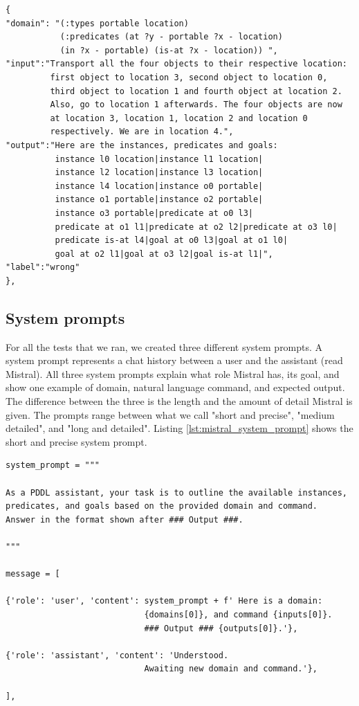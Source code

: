 \begin{lstlisting}[caption={An element of shot set 2. Notice the "label" marker. The output is wrong due to the text before first instance.}, label=lst:elem_shot_set_2]
{
"domain": "(:types portable location)
           (:predicates (at ?y - portable ?x - location)
           (in ?x - portable) (is-at ?x - location)) ",
"input":"Transport all the four objects to their respective location:
         first object to location 3, second object to location 0,
         third object to location 1 and fourth object at location 2.
         Also, go to location 1 afterwards. The four objects are now
         at location 3, location 1, location 2 and location 0
         respectively. We are in location 4.",
"output":"Here are the instances, predicates and goals:
          instance l0 location|instance l1 location|
          instance l2 location|instance l3 location|
          instance l4 location|instance o0 portable|
          instance o1 portable|instance o2 portable|
          instance o3 portable|predicate at o0 l3|
          predicate at o1 l1|predicate at o2 l2|predicate at o3 l0|
          predicate is-at l4|goal at o0 l3|goal at o1 l0|
          goal at o2 l1|goal at o3 l2|goal is-at l1|",
"label":"wrong"
},
\end{lstlisting}

\subsection{System prompts}\label{ssec:system_prompt}
For all the tests that we ran, we created three different system prompts. A system prompt represents a chat history between a user and the assistant (read Mistral). All three system prompts explain what role Mistral has, its goal, and show one example of domain, natural language command, and expected output. The difference between the three is the length and the amount of detail Mistral is given. The prompts range between what we call "short and precise", "medium detailed", and "long and detailed". Listing \ref{lst:mistral_system_prompt} shows the short and precise system prompt.

\begin{lstlisting}[caption={The short and precise system prompt. domains[0], inputs[0] and outputs[0] is the first element from the shot set.}, label=lst:mistral_system_prompt]
system_prompt = """

As a PDDL assistant, your task is to outline the available instances,
predicates, and goals based on the provided domain and command.
Answer in the format shown after ### Output ###.

"""

message = [

{'role': 'user', 'content': system_prompt + f' Here is a domain:
                            {domains[0]}, and command {inputs[0]}.
                            ### Output ### {outputs[0]}.'},
                            
{'role': 'assistant', 'content': 'Understood.
                            Awaiting new domain and command.'},
                            
],
\end{lstlisting}

